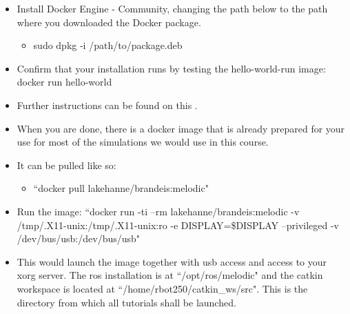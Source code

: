 \begin{frame}
	\begin{itemize}
		\item Install Docker Engine - Community, changing the path below to the path where you downloaded the Docker package.
		\vspace{.5em}
		\begin{itemize}
			\item \textsf{sudo dpkg -i /path/to/package.deb}
		\end{itemize}
		\item Confirm that your installation runs by testing the \textsf{hello-world-run} image:
			\textsf{docker run hello-world}
			\vspace{.5em}
		\item Further instructions can be found on this \href{https://docs.docker.com/install/linux/docker-ce/ubuntu/}{}.
	\end{itemize}
\end{frame}

\begin{frame}
\begin{itemize}
	\item When you are done, there is a docker image that is already prepared for your use for most of the simulations we would use in this course.
	\vspace{.5em}
	\item It can be pulled like so:
	\vspace{.5em}
	\begin{itemize}
		\small \item \textsf{``docker pull lakehanne/brandeis:melodic"}
	\end{itemize}
	\vspace{.5em}
	\item Run the image:
	\vspace{.5em}
	\small \textsf{``docker run -ti --rm lakehanne/brandeis:melodic -v /tmp/.X11-unix:/tmp/.X11-unix:ro -e DISPLAY=\$DISPLAY --privileged -v /dev/bus/usb:/dev/bus/usb"}
	\vspace{.5em}
	\item This would launch the image together with usb access and access to your xorg server.  The ros installation is at \textsf{``/opt/ros/melodic"} and the catkin workspace is located at \textsf{``/home/rbot250/catkin\_ws/src"}. This is the directory from which all tutorials shall be launched.
\end{itemize}
\end{frame}

